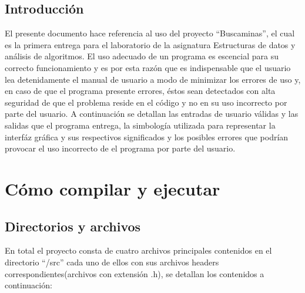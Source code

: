 \documentclass[letterpaper,12pt]{report}
\begin{document}
\section {Introducci\'on}

El presente documento hace referencia al uso del proyecto ``Buscaminas'', el cual es la primera entrega para el laboratorio de la asignatura Estructuras de datos y análisis de algoritmos. El uso adecuado de un programa es escencial para su correcto funcionamiento y es por esta razón que es indispensable que el usuario lea detenidamente el manual de usuario a modo de minimizar los errores de uso y, en caso de que el programa presente errores, éstos sean detectados con alta seguridad de que el problema reside en el código y no en su uso incorrecto por parte del usuario. A continuación se detallan las entradas de usuario válidas y las salidas que el programa entrega, la simbología utilizada para representar la interfáz gráfica y sus respectivos significados y los posibles errores que podrían provocar el uso incorrecto de el programa por parte del usuario.

\chapter {C\'omo compilar y ejecutar}

\section {Directorios y archivos}

En total el proyecto consta de cuatro archivos principales contenidos en el directorio ``/src'' cada uno de ellos con sus archivos headers correspondientes(archivos con extensión .h), se detallan los contenidos a continuación: 
\end{document}
